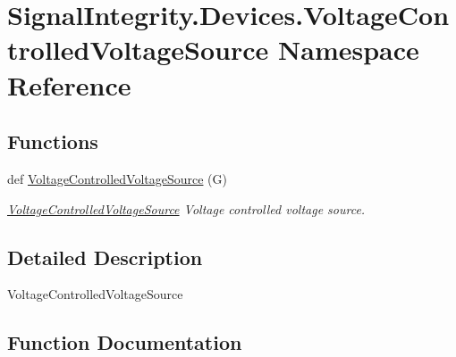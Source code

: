 \hypertarget{namespaceSignalIntegrity_1_1Devices_1_1VoltageControlledVoltageSource}{}\section{Signal\+Integrity.\+Devices.\+Voltage\+Controlled\+Voltage\+Source Namespace Reference}
\label{namespaceSignalIntegrity_1_1Devices_1_1VoltageControlledVoltageSource}
\subsection*{Functions}
\begin{DoxyCompactItemize}
\item 
def \hyperlink{namespaceSignalIntegrity_1_1Devices_1_1VoltageControlledVoltageSource_ad796c00ed129dad0a3fec2092567bbf1}{Voltage\+Controlled\+Voltage\+Source} (G)
\begin{DoxyCompactList}\small\item\em \hyperlink{namespaceSignalIntegrity_1_1Devices_1_1VoltageControlledVoltageSource}{Voltage\+Controlled\+Voltage\+Source} Voltage controlled voltage source. \end{DoxyCompactList}\end{DoxyCompactItemize}


\subsection{Detailed Description}
\begin{DoxyVerb}VoltageControlledVoltageSource\end{DoxyVerb}
 

\subsection{Function Documentation}
\mbox{\label{namespaceSignalIntegrity_1_1Devices_1_1VoltageControlledVoltageSource_ad796c00ed129dad0a3fec2092567bbf1}} 
